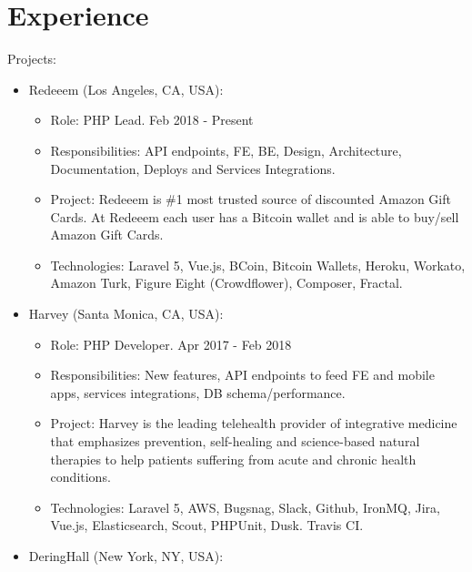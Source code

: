 \documentclass[11pt,a4paper,sans]{moderncv}        %
\begin{document}
\section{Experience}
  {
    Projects:\\
    \begin{itemize}
      \item Redeeem (Los Angeles, CA, USA):
        \begin{itemize}
          \item Role: PHP Lead. Feb 2018 - Present
          \item Responsibilities: API endpoints, FE, BE, Design, Architecture, Documentation, Deploys and Services Integrations.
          \item Project: Redeeem is \#1 most trusted source of discounted Amazon Gift Cards. At Redeeem each user has a Bitcoin wallet and is able to buy/sell Amazon Gift Cards.
          \item Technologies: Laravel 5, Vue.js, BCoin, Bitcoin Wallets, Heroku, Workato, Amazon Turk, Figure Eight (Crowdflower), Composer, Fractal.
        \end{itemize}
      \item Harvey (Santa Monica, CA, USA):
        \begin{itemize}
          \item Role: PHP Developer. Apr 2017 - Feb 2018
          \item Responsibilities: New features, API endpoints to feed FE and mobile apps, services integrations, DB schema/performance.
          \item Project: Harvey is the leading telehealth provider of integrative medicine that emphasizes prevention, self-healing and science-based natural therapies to help patients suffering from acute and chronic health conditions.
          \item Technologies: Laravel 5, AWS, Bugsnag, Slack, Github, IronMQ, Jira, Vue.js, Elasticsearch, Scout, PHPUnit, Dusk. Travis CI.
        \end{itemize}
      \item DeringHall (New York, NY, USA):
        \begin{itemize}

\end{itemize}
\end{itemize}}
\end{document}
